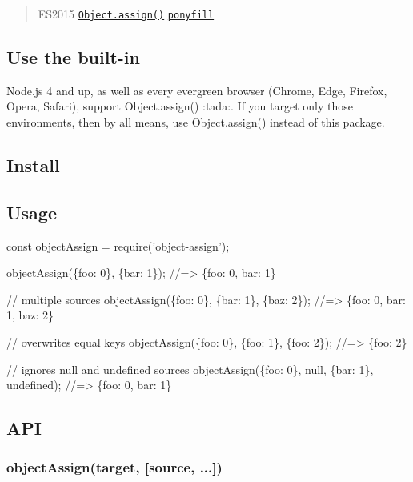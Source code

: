 \begin{quote}
E\+S2015 \href{http://www.2ality.com/2014/01/object-assign.html}{\tt {\ttfamily Object.\+assign()}} \href{https://ponyfill.com}{\tt ponyfill} \end{quote}


\subsection*{Use the built-\/in}

Node.\+js 4 and up, as well as every evergreen browser (Chrome, Edge, Firefox, Opera, Safari), support {\ttfamily Object.\+assign()} \+:tada\+:. If you target only those environments, then by all means, use {\ttfamily Object.\+assign()} instead of this package.

\subsection*{Install}




\subsection*{Usage}


\begin{DoxyCode}
const objectAssign = require('object-assign');

objectAssign(\{foo: 0\}, \{bar: 1\});
//=> \{foo: 0, bar: 1\}

// multiple sources
objectAssign(\{foo: 0\}, \{bar: 1\}, \{baz: 2\});
//=> \{foo: 0, bar: 1, baz: 2\}

// overwrites equal keys
objectAssign(\{foo: 0\}, \{foo: 1\}, \{foo: 2\});
//=> \{foo: 2\}

// ignores null and undefined sources
objectAssign(\{foo: 0\}, null, \{bar: 1\}, undefined);
//=> \{foo: 0, bar: 1\}
\end{DoxyCode}


\subsection*{A\+PI}

\subsubsection*{object\+Assign(target, \mbox{[}source, ...\mbox{]})}

